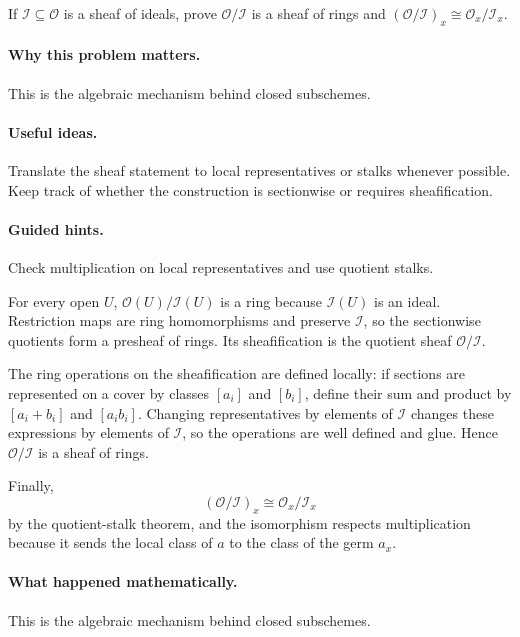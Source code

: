 \begin{problem}\label{prob:vi15-p16}
If $\mathcal I\subseteq\mathcal O$ is a sheaf of ideals, prove $\mathcal O/\mathcal I$ is a sheaf of rings and $(\mathcal O/\mathcal I)_x\cong\mathcal O_x/\mathcal I_x$.
\end{problem}

\ifdefined\FullProblemDossiers
\paragraph{Why this problem matters.}
This is the algebraic mechanism behind closed subschemes.

\paragraph{Useful ideas.}
Translate the sheaf statement to local representatives or stalks whenever possible.  Keep track of whether the construction is sectionwise or requires sheafification.

\paragraph{Guided hints.}
Check multiplication on local representatives and use quotient stalks.

\begin{solution}
For every open $U$, $\mathcal O(U)/\mathcal I(U)$ is a ring because $\mathcal I(U)$ is an ideal. Restriction maps are ring homomorphisms and preserve $\mathcal I$, so the sectionwise quotients form a presheaf of rings. Its sheafification is the quotient sheaf $\mathcal O/\mathcal I$.

The ring operations on the sheafification are defined locally: if sections are represented on a cover by classes $[a_i]$ and $[b_i]$, define their sum and product by $[a_i+b_i]$ and $[a_ib_i]$. Changing representatives by elements of $\mathcal I$ changes these expressions by elements of $\mathcal I$, so the operations are well defined and glue. Hence $\mathcal O/\mathcal I$ is a sheaf of rings.

Finally,
\[
(\mathcal O/\mathcal I)_x\cong\mathcal O_x/\mathcal I_x
\]
by the quotient-stalk theorem, and the isomorphism respects multiplication because it sends the local class of $a$ to the class of the germ $a_x$.
\end{solution}

\paragraph{What happened mathematically.}
This is the algebraic mechanism behind closed subschemes.

